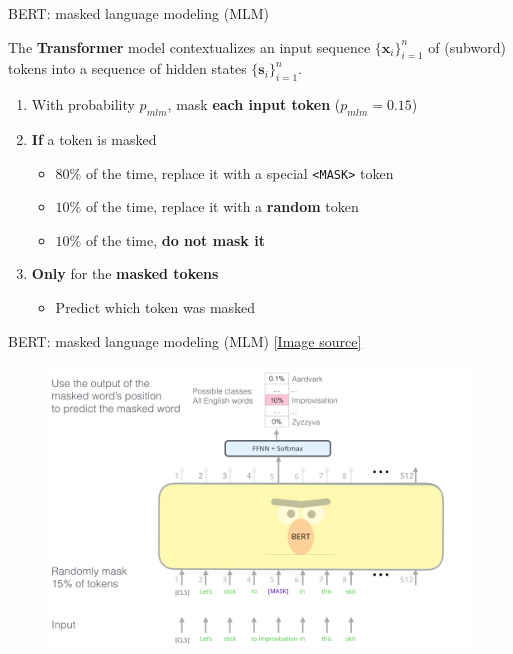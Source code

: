 \documentclass[12pt,aspectratio=169,handout]{beamer}
\begin{document}
\begin{frame}[fragile]{BERT: masked language modeling (MLM)}

The \textbf{Transformer} model contextualizes an input sequence $\{\bm{x}_i\}_{i=1}^n$ of (subword) tokens into a sequence of hidden states $\{\bm{s}_i\}_{i=1}^n$.

\pause

\begin{enumerate}
	\item With probability $p_{mlm}$, mask \textbf{each input token} ($p_{mlm}=0.15$)
	\pause
	\item \textbf{If} a token is masked
	\begin{itemize}
		\item $80\%$ of the time, replace it with a special \verb|<MASK>| token
		\pause
		\item $10\%$ of the time, replace it with a \textbf{random} token
		\pause
		\item $10\%$ of the time, \textbf{do not mask it}
	\end{itemize}
	\pause
	\item \textbf{Only} for the \textbf{masked tokens}
	\begin{itemize}
		\item Predict which token was masked
	\end{itemize}
\end{enumerate}

\end{frame}

\begin{frame}{BERT:  masked language modeling (MLM) \href{http://jalammar.github.io/illustrated-bert/}{[\underline{Image source}]}}

	\begin{figure}[h]
		\includegraphics[height=7.5cm]{BERT-language-modeling-masked-lm.png}
	\end{figure}

\end{frame}
\end{document}
